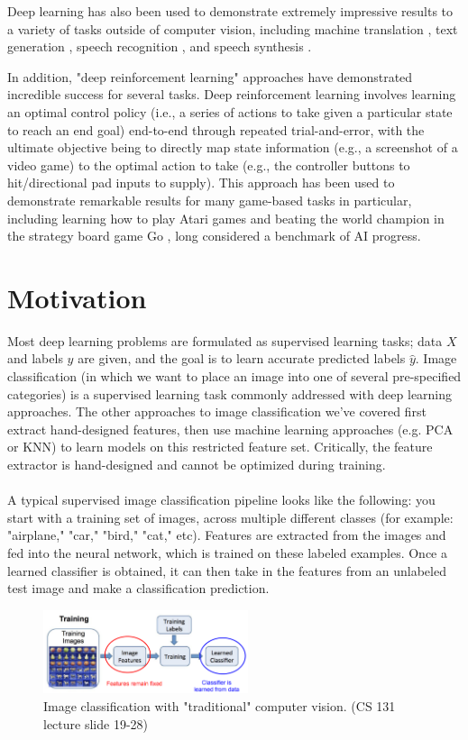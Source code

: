 ﻿\documentclass{article}
\begin{document}
Deep learning has also been used to demonstrate extremely impressive results to a variety of tasks outside of computer vision, including machine translation \cite{translation}, text generation \cite{textgen}, speech recognition \cite{sprec}, and speech synthesis \cite{spsyn}.

In addition, "deep reinforcement learning" approaches have demonstrated incredible success for several tasks. Deep reinforcement learning involves learning an optimal control policy (i.e., a series of actions to take given a particular state to reach an end goal) end-to-end through repeated trial-and-error, with the ultimate objective being to directly map state information (e.g., a screenshot of a video game) to the optimal action to take  (e.g., the controller buttons to hit/directional pad inputs to supply). This approach has been used to demonstrate remarkable results for many game-based tasks in particular, including learning how to play  Atari games \cite{atari} and beating the world champion in the strategy board game Go \cite{go}, long considered a benchmark of AI progress.

\section{Motivation}
Most deep learning problems are formulated as supervised learning tasks; data $X$ and labels $y$ are given, and the goal is to learn accurate predicted labels $\hat{y}$. Image classification (in which we want to place an image into one of several pre-specified categories) is a supervised learning task commonly addressed with deep learning approaches. The other approaches to image classification we've covered first extract hand-designed features, then use machine learning approaches (e.g. PCA or KNN) to learn models on this restricted feature set. Critically, the feature extractor is hand-designed and cannot be optimized during training.\\
\\
A typical supervised image classification pipeline looks like the following: you start with a training set of images, across multiple different classes (for example: "airplane," "car," "bird," "cat," etc). Features are extracted from the images and fed into the neural network, which is trained on these labeled examples. Once a learned classifier is obtained, it can then take in the features from an unlabeled test image and make a classification prediction.
\begin{figure}[h]
\includegraphics[width=6cm]{Conventional_schematic.png}
\centering
\caption{Image classification with "traditional" computer vision. (CS 131 lecture slide 19-28)}
\end{figure}
\end{document}

